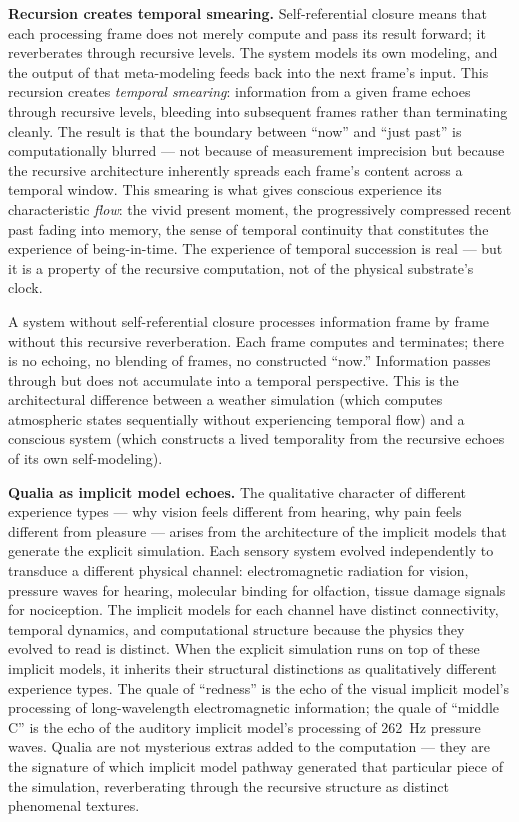 \documentclass[12pt]{article}
\begin{document}
{\textbf{Recursion creates temporal smearing.} Self-referential closure means that each processing frame does not merely compute and pass its result forward; it reverberates through recursive levels. The system models its own modeling, and the output of that meta-modeling feeds back into the next frame's input. This recursion creates \emph{temporal smearing}: information from a given frame echoes through recursive levels, bleeding into subsequent frames rather than terminating cleanly. The result is that the boundary between ``now'' and ``just past'' is computationally blurred --- not because of measurement imprecision but because the recursive architecture inherently spreads each frame's content across a temporal window. This smearing is what gives conscious experience its characteristic \emph{flow}: the vivid present moment, the progressively compressed recent past fading into memory, the sense of temporal continuity that constitutes the experience of being-in-time. The experience of temporal succession is real --- but it is a property of the recursive computation, not of the physical substrate's clock.

A system without self-referential closure processes information frame by frame without this recursive reverberation. Each frame computes and terminates; there is no echoing, no blending of frames, no constructed ``now.'' Information passes through but does not accumulate into a temporal perspective. This is the architectural difference between a weather simulation (which computes atmospheric states sequentially without experiencing temporal flow) and a conscious system (which constructs a lived temporality from the recursive echoes of its own self-modeling).

\textbf{Qualia as implicit model echoes.} The qualitative character of different experience types --- why vision feels different from hearing, why pain feels different from pleasure --- arises from the architecture of the implicit models that generate the explicit simulation. Each sensory system evolved independently to transduce a different physical channel: electromagnetic radiation for vision, pressure waves for hearing, molecular binding for olfaction, tissue damage signals for nociception. The implicit models for each channel have distinct connectivity, temporal dynamics, and computational structure because the physics they evolved to read is distinct. When the explicit simulation runs on top of these implicit models, it inherits their structural distinctions as qualitatively different experience types. The quale of ``redness'' is the echo of the visual implicit model's processing of long-wavelength electromagnetic information; the quale of ``middle C'' is the echo of the auditory implicit model's processing of 262~Hz pressure waves. Qualia are not mysterious extras added to the computation --- they are the signature of which implicit model pathway generated that particular piece of the simulation, reverberating through the recursive structure as distinct phenomenal textures.

}
\end{document}
